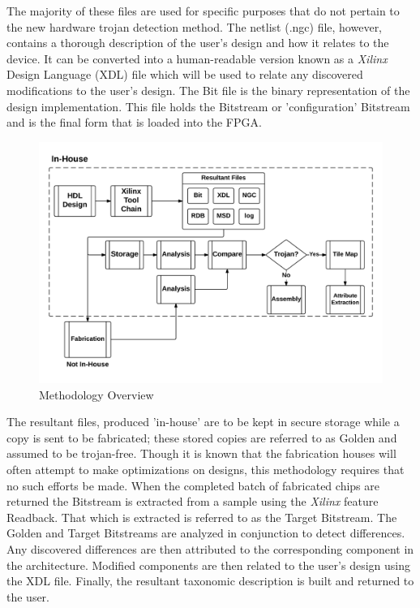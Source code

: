 \documentclass[journal, hidelinks]{IEEEtran}
\begin{document}
The majority of these files are used for specific purposes that do not pertain to the new hardware trojan detection method.
The netlist (.ngc) file, however, contains a thorough description of the user's design and how it relates to the device.
It can be converted into a human-readable version known as a \textit{Xilinx} Design Language (XDL) file which will be used to relate any discovered modifications to the user's design.
The Bit file is the binary representation of the design implementation.
This file holds the Bitstream or 'configuration' Bitstream and is the final form that is loaded into the FPGA.
\begin{figure}
	\centering
	\includegraphics[width=1\linewidth]{Figures/methodologyOverview}
	\caption[Methodology Overview]{Methodology Overview}
	\label{fig:methodologyOverview}
\end{figure}
The resultant files, produced 'in-house' are to be kept in secure storage while a copy is sent to be fabricated; these stored copies are referred to as Golden and assumed to be trojan-free.
Though it is known that the fabrication houses will often attempt to make optimizations on designs, this methodology requires that no such efforts be made.
When the completed batch of fabricated chips are returned the Bitstream is extracted from a sample using the \textit{Xilinx} feature Readback. 
That which is extracted is referred to as the Target Bitstream.
The Golden and Target Bitstreams are analyzed in conjunction to detect differences.
Any discovered differences are then attributed to the corresponding component in the architecture.
Modified components are then related to the user's design using the XDL file.
Finally, the resultant taxonomic description is built and returned to the user.
\end{document}
